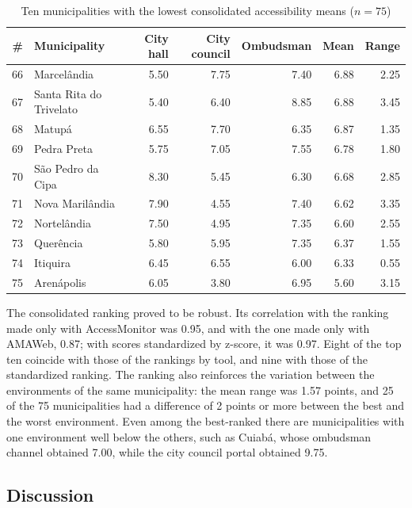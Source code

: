 \documentclass[12pt]{article}
\begin{document}
\begin{table}[ht]
\centering
\caption{Ten municipalities with the lowest consolidated accessibility means ($n = 75$)}
\label{tab:ranking_ultimos}
\footnotesize
\setlength{\tabcolsep}{4pt}
\begin{tabular}{rlrrrrr}
\toprule
\textbf{\#} & \textbf{Municipality} & \textbf{City hall} & \textbf{City council} & \textbf{Ombudsman} & \textbf{Mean} & \textbf{Range} \\
\midrule
66 & Marcelândia             & 5.50 & 7.75 & 7.40 & 6.88 & 2.25 \\
67 & Santa Rita do Trivelato & 5.40 & 6.40 & 8.85 & 6.88 & 3.45 \\
68 & Matupá                  & 6.55 & 7.70 & 6.35 & 6.87 & 1.35 \\
69 & Pedra Preta             & 5.75 & 7.05 & 7.55 & 6.78 & 1.80 \\
70 & São Pedro da Cipa       & 8.30 & 5.45 & 6.30 & 6.68 & 2.85 \\
71 & Nova Marilândia         & 7.90 & 4.55 & 7.40 & 6.62 & 3.35 \\
72 & Nortelândia             & 7.50 & 4.95 & 7.35 & 6.60 & 2.55 \\
73 & Querência               & 5.80 & 5.95 & 7.35 & 6.37 & 1.55 \\
74 & Itiquira                & 6.45 & 6.55 & 6.00 & 6.33 & 0.55 \\
75 & Arenápolis              & 6.05 & 3.80 & 6.95 & 5.60 & 3.15 \\
\bottomrule
\end{tabular}
\end{table}

The consolidated ranking proved to be robust. Its correlation with the ranking made only with AccessMonitor was 0.95, and with the one made only with AMAWeb, 0.87; with scores standardized by z-score, it was 0.97. Eight of the top ten coincide with those of the rankings by tool, and nine with those of the standardized ranking. The ranking also reinforces the variation between the environments of the same municipality: the mean range was 1.57 points, and 25 of the 75 municipalities had a difference of 2 points or more between the best and the worst environment. Even among the best-ranked there are municipalities with one environment well below the others, such as Cuiabá, whose ombudsman channel obtained 7.00, while the city council portal obtained 9.75.

\subsection{Discussion}
\end{document}
